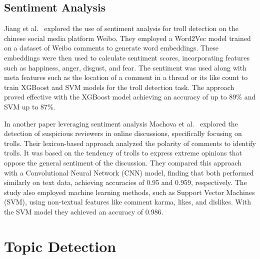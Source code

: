 \documentclass[twoside]{ctuthesis}
\theoremstyle{plain}
\theoremstyle{definition}
\theoremstyle{note}
\begin{document}
\subsection{Sentiment Analysis}
Jiang et al.~\cite{Jiang2021Sentiment} explored the use of sentiment analysis for troll detection on the chinese social media platform Weibo.  They employed a Word2Vec model trained on a dataset of Weibo comments to generate word embeddings. These embeddings were then used to calculate sentiment scores, incorporating features such as happiness, anger, disgust, and fear. The sentiment was used along with meta features such as the location of a comment in a thread or its like count to train XGBoost and SVM models for the troll detection task. The approach proved effective with the XGBoost model achieving an accuracy of up to 89\% and SVM up to 87\%.\par
In another paper leveraging sentiment analysis Machova et al.~\cite{Machova2022Comparison} explored the detection of suspicious reviewers in online discussions, specifically focusing on trolls. Their lexicon-based approach analyzed the polarity of comments to identify trolls. It was based on the tendency of trolls to express extreme opinions that oppose the general sentiment of the discussion. They compared this approach with a Convolutional Neural Network (CNN) model, finding that both performed similarly on text data, achieving accuracies of 0.95 and 0.959, respectively.  The study also employed machine learning methods, such as Support Vector Machines (SVM), using non-textual features like comment karma, likes, and dislikes. With the SVM model they achieved an accuracy of 0.986.

\section{Topic Detection}

\end{document}
